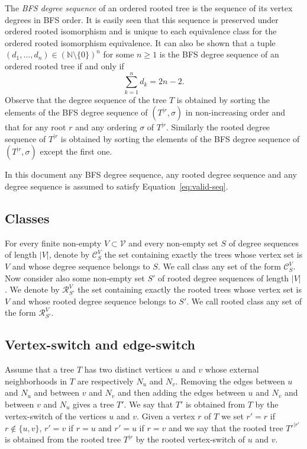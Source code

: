 \documentclass[11 pt]{modarticle}
\newcommand{\cN}{\mathbb{N}}
\newcommand{\vset}{\mathcal{V}}
\newcommand{\size}[1]{|#1|}
\newcommand{\rtree}[2]{{#1}^{\lvert #2}}
\newcommand{\ortree}[3]{(\rtree{#1}{#2},{#3})}
\newcommand{\tclass}{\mathcal{C}}
\newcommand{\rtclass}{\mathcal{R}}
\newcommand{\pclass}[2]{\tclass^{#1}_{#2}}
\newcommand{\rpclass}[2]{\rtclass^{#1}_{#2}}
\begin{document}
The \emph{BFS degree sequence} of an ordered rooted tree is the sequence of its vertex degrees in BFS order. It is easily seen that this sequence is preserved under ordered rooted isomorphism and is unique to each equivalence class for the ordered rooted isomorphism equivalence. It can also be shown that a tuple $(d_1, \dots, d_n) \in (\cN \setminus \{0\})^n$ for some $n \geq 1$ is the BFS degree sequence of an ordered rooted tree if and only if
\begin{equation}
	\underset{k=1}{\overset{n}{\sum}} d_k = 2n - 2 \label{eq:valid-seq}.
\end{equation}
Observe that the degree sequence of the tree $T$ is obtained by sorting the elements of the BFS degree sequence of $\ortree{T}{r}{\sigma}$ in non-increasing order and that for any root $r$ and any ordering $\sigma$ of $\rtree{T}{r}$. Similarly the rooted degree sequence of $\rtree{T}{r}$ is obtained by sorting the elements of the BFS degree sequence of $\ortree{T}{r}{\sigma}$ except the first one.

In this document any BFS degree sequence, any rooted degree sequence and any degree sequence is assumed to satisfy Equation~\eqref{eq:valid-seq}.

\subsection{Classes}

\begin{defi}
For every finite non-empty $V \subset \vset$ and every non-empty set $S$ of degree sequences of length $\size{V}$, denote by $\pclass{V}{S}$ the set containing exactly the trees whose vertex set is $V$ and whose degree sequence belongs to $S$. We call class any set of the form $\pclass{V}{S}$. Now consider also some non-empty set $S'$ of rooted degree sequences of length $\size{V}$. We denote by $\rpclass{V}{S'}$ the set containing exactly the rooted trees whose vertex set is $V$ and whose rooted degree sequence belongs to $S'$. We call rooted class any set of the form $\rpclass{V}{S'}$.
\end{defi}

\subsection{Vertex-switch and edge-switch}

\begin{defi}
Assume that a tree $T$ has two distinct vertices $u$ and $v$ whose external neighborhoods in $T$ are respectively $N_u$ and $N_v$. Removing the edges between $u$ and $N_u$ and between $v$ and $N_v$ and then adding the edges between $u$ and $N_v$ and between $v$ and $N_u$ gives a tree $T'$. We say that $T'$ is obtained from $T$ by the vertex-switch of the vertices $u$ and $v$. Given a vertex $r$ of $T$ we set $r' = r$ if $r \notin \{u,v\}$, $r' = v$ if $r = u$ and $r' = u$ if $r = v$ and we say that the rooted tree $\rtree{T'}{r'}$ is obtained from the rooted tree $\rtree{T}{r}$ by the rooted vertex-switch of $u$ and $v$.
\end{defi}
\end{document}
